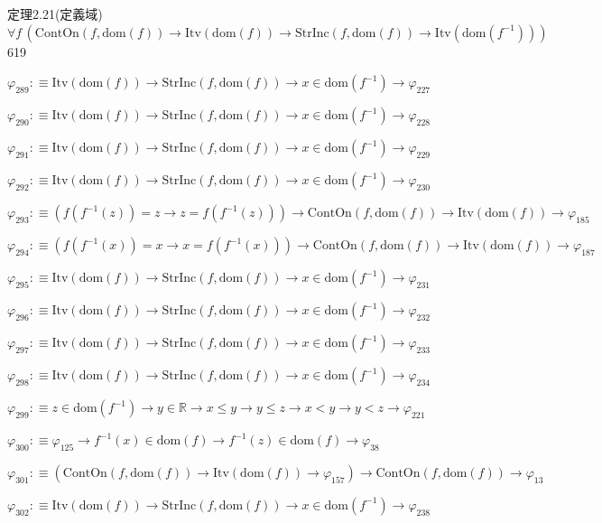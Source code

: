 \begin{fullproof}{定理2.21(定義域)}{$\forall f\,(\mathrm{ContOn}(f,\mathrm{dom}(f)) \to \mathrm{Itv}(\mathrm{dom}(f)) \to \mathrm{StrInc}(f,\mathrm{dom}(f)) \to \mathrm{Itv}(\mathrm{dom}(f^{-1})))$}{619}
\begin{abbrevlist}
\item $\varphi_{289} :\equiv \mathrm{Itv}(\mathrm{dom}(f)) \to \mathrm{StrInc}(f,\mathrm{dom}(f)) \to x \in \mathrm{dom}(f^{-1}) \to \varphi_{227}$
\item $\varphi_{290} :\equiv \mathrm{Itv}(\mathrm{dom}(f)) \to \mathrm{StrInc}(f,\mathrm{dom}(f)) \to x \in \mathrm{dom}(f^{-1}) \to \varphi_{228}$
\item $\varphi_{291} :\equiv \mathrm{Itv}(\mathrm{dom}(f)) \to \mathrm{StrInc}(f,\mathrm{dom}(f)) \to x \in \mathrm{dom}(f^{-1}) \to \varphi_{229}$
\item $\varphi_{292} :\equiv \mathrm{Itv}(\mathrm{dom}(f)) \to \mathrm{StrInc}(f,\mathrm{dom}(f)) \to x \in \mathrm{dom}(f^{-1}) \to \varphi_{230}$
\item $\varphi_{293} :\equiv (f(f^{-1}(z)) = z \to z = f(f^{-1}(z))) \to \mathrm{ContOn}(f,\mathrm{dom}(f)) \to \mathrm{Itv}(\mathrm{dom}(f)) \to \varphi_{185}$
\item $\varphi_{294} :\equiv (f(f^{-1}(x)) = x \to x = f(f^{-1}(x))) \to \mathrm{ContOn}(f,\mathrm{dom}(f)) \to \mathrm{Itv}(\mathrm{dom}(f)) \to \varphi_{187}$
\item $\varphi_{295} :\equiv \mathrm{Itv}(\mathrm{dom}(f)) \to \mathrm{StrInc}(f,\mathrm{dom}(f)) \to x \in \mathrm{dom}(f^{-1}) \to \varphi_{231}$
\item $\varphi_{296} :\equiv \mathrm{Itv}(\mathrm{dom}(f)) \to \mathrm{StrInc}(f,\mathrm{dom}(f)) \to x \in \mathrm{dom}(f^{-1}) \to \varphi_{232}$
\item $\varphi_{297} :\equiv \mathrm{Itv}(\mathrm{dom}(f)) \to \mathrm{StrInc}(f,\mathrm{dom}(f)) \to x \in \mathrm{dom}(f^{-1}) \to \varphi_{233}$
\item $\varphi_{298} :\equiv \mathrm{Itv}(\mathrm{dom}(f)) \to \mathrm{StrInc}(f,\mathrm{dom}(f)) \to x \in \mathrm{dom}(f^{-1}) \to \varphi_{234}$
\item $\varphi_{299} :\equiv z \in \mathrm{dom}(f^{-1}) \to y \in \mathbb{R} \to x \leq y \to y \leq z \to x < y \to y < z \to \varphi_{221}$
\item $\varphi_{300} :\equiv \varphi_{125} \to f^{-1}(x) \in \mathrm{dom}(f) \to f^{-1}(z) \in \mathrm{dom}(f) \to \varphi_{38}$
\item $\varphi_{301} :\equiv (\mathrm{ContOn}(f,\mathrm{dom}(f)) \to \mathrm{Itv}(\mathrm{dom}(f)) \to \varphi_{157}) \to \mathrm{ContOn}(f,\mathrm{dom}(f)) \to \varphi_{13}$
\item $\varphi_{302} :\equiv \mathrm{Itv}(\mathrm{dom}(f)) \to \mathrm{StrInc}(f,\mathrm{dom}(f)) \to x \in \mathrm{dom}(f^{-1}) \to \varphi_{238}$

\end{abbrevlist}
\end{fullproof}
